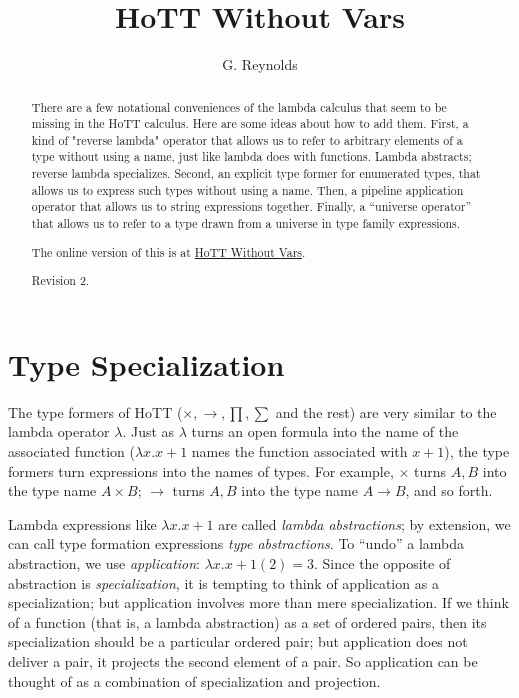 \documentclass{article}
\begin{document}
\title{HoTT Without Vars}
\author{G. Reynolds}
\maketitle
\large

\begin{abstract}
  There are a few notational conveniences of the lambda calculus that
  seem to be missing in the HoTT calculus. Here are some ideas about
  how to add them.  First, a kind of "reverse lambda" operator that
  allows us to refer to arbitrary elements of a type without using a
  name, just like lambda does with functions.  Lambda abstracts;
  reverse lambda specializes.  Second, an explicit type former for
  enumerated types, that allows us to express such types without using
  a name.  Then, a pipeline application operator that allows us to
  string expressions together.  Finally, a ``universe operator'' that
  allows us to refer to a type drawn from a universe in type family
  expressions.

  The online version of this is at
  \href{http://blog.mobileink.com/2015/06/hott-without-vars.html}{HoTT
    Without Vars}.

  Revision 2.
\end{abstract}

\section{Type Specialization}

The type formers of HoTT (\(\times, \to, \prod, \sum\) and the rest)
are very similar to the lambda operator \(\lambda\).  Just as
\(\lambda\) turns an open formula into the name of the associated
function (\(\lambda x.x+1\) names the function associated with
\(x+1\)), the type formers turn expressions into the names of types.
For example, \(\times\) turns \(A, B\) into the type name \(A\times
B\); \(\to\) turns \(A, B\) into the type name \(A\to B\), and so
forth.

Lambda expressions like \(\lambda x.x+1\) are called \emph{lambda
  abstractions}; by extension, we can call type formation expressions
\emph{type abstractions}.  To ``undo'' a lambda abstraction, we use
\emph{application}: \(\lambda x.x+1(2) = 3\).  Since the opposite of
abstraction is \emph{specialization}, it is tempting to think of
application as a specialization; but application involves more than
mere specialization.  If we think of a function (that is, a lambda
abstraction) as a set of ordered pairs, then its specialization should
be a particular ordered pair; but application does not deliver a pair,
it projects the second element of a pair.  So application can be
thought of as a combination of specialization and projection.
\end{document}
